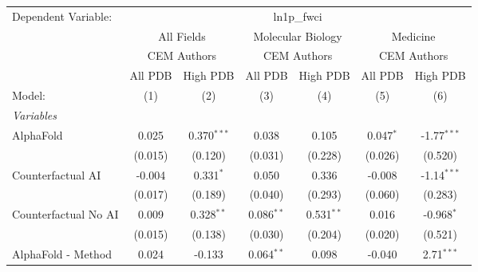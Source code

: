 \begingroup
\centering
\begin{tabular}{lcccccc}
   \tabularnewline \midrule \midrule
   Dependent Variable: & \multicolumn{6}{c}{ln1p\_fwci}\\
 & \multicolumn{2}{c}{All Fields} & \multicolumn{2}{c}{Molecular Biology} & \multicolumn{2}{c}{Medicine} \\
\cmidrule(lr){2-3} \cmidrule(lr){4-5} \cmidrule(lr){6-7}
 & \multicolumn{2}{c}{CEM Authors} & \multicolumn{2}{c}{CEM Authors} & \multicolumn{2}{c}{CEM Authors} \\
\cmidrule(lr){2-3} \cmidrule(lr){4-5} \cmidrule(lr){6-7}
 & \multicolumn{1}{c}{All PDB} & \multicolumn{1}{c}{High PDB} & \multicolumn{1}{c}{All PDB} & \multicolumn{1}{c}{High PDB} & \multicolumn{1}{c}{All PDB} & \multicolumn{1}{c}{High PDB} \\
\cmidrule(lr){2-2} \cmidrule(lr){3-3} \cmidrule(lr){4-4} \cmidrule(lr){5-5} \cmidrule(lr){6-6} \cmidrule(lr){7-7}
   Model:                                                     & (1)         & (2)           & (3)           & (4)           & (5)         & (6)\\  
   \midrule
   \emph{Variables}\\
   AlphaFold                                                  & 0.025       & 0.370$^{***}$ & 0.038         & 0.105         & 0.047$^{*}$ & -1.77$^{***}$\\   
                                                              & (0.015)     & (0.120)       & (0.031)       & (0.228)       & (0.026)     & (0.520)\\   
   Counterfactual AI                                          & -0.004      & 0.331$^{*}$   & 0.050         & 0.336         & -0.008      & -1.14$^{***}$\\   
                                                              & (0.017)     & (0.189)       & (0.040)       & (0.293)       & (0.060)     & (0.283)\\   
   Counterfactual No AI                                       & 0.009       & 0.328$^{**}$  & 0.086$^{**}$  & 0.531$^{**}$  & 0.016       & -0.968$^{*}$\\   
                                                              & (0.015)     & (0.138)       & (0.030)       & (0.204)       & (0.020)     & (0.521)\\   
   AlphaFold - Method                                         & 0.024       & -0.133        & 0.064$^{**}$  & 0.098         & -0.040      & 2.71$^{***}$\\   

\end{tabular}
